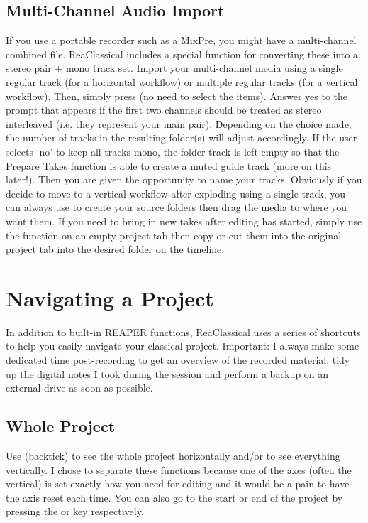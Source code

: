 \documentclass[10pt,american]{article}
\begin{document}
\subsection{Multi-Channel Audio Import}

If you use a portable recorder such as a MixPre, you might have a multi-channel
combined file. ReaClassical includes a special function for converting these
into a stereo pair + mono track set. Import your multi-channel media using a
single regular track (for a horizontal workflow) or multiple regular tracks (for
a vertical workflow). Then, simply press  (no need to select the
items). Answer yes to the prompt that appears if the first two channels should
be treated as stereo interleaved (i.e. they represent your main pair). Depending
on the choice made, the number of tracks in the resulting folder(s) will adjust
accordingly. If the user selects \textquoteleft no\textquoteright{} to keep all
tracks mono, the folder track is left empty so that the Prepare Takes 
function is able to create a muted guide track (more on this later!). Then you
are given the opportunity to name your tracks. Obviously if you decide to move
to a vertical workflow after exploding using a single track, you can always use
 to create your source folders then drag the media to where you want
them. If you need to bring in new takes after editing has started, simply use
the function on an empty project tab then copy or cut them into the original
project tab into the desired folder on the timeline.

\section{Navigating a Project}

In addition to built-in REAPER functions, ReaClassical uses a series of
shortcuts to help you easily navigate your classical project. Important: I
always make some dedicated time post-recording to get an overview of the
recorded material, tidy up the digital notes I took during the session and
perform a backup on an external drive as soon as possible.

\subsection{Whole Project}

Use  (backtick) to see the whole project horizontally and/or
 to see everything vertically. I chose to separate these functions
because one of the axes (often the vertical) is set exactly how you need for
editing and it would be a pain to have the axis reset each time. You can also go
to the start or end of the project by pressing the  or  key
respectively. 
\end{document}
